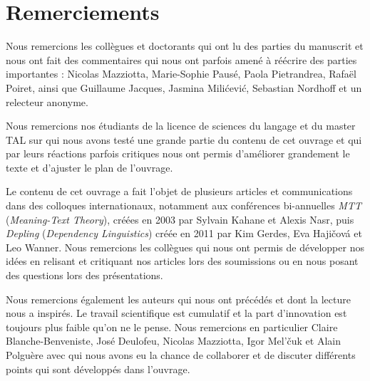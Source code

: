 \section{Remerciements}\label{sec:0.0.13}

Nous remercions les collègues et doctorants qui ont lu des parties du manuscrit et nous ont fait des commentaires qui nous ont parfois amené à réécrire des parties importantes : Nicolas Mazziotta, Marie-Sophie Pausé, Paola Pietrandrea, Rafaël Poiret, ainsi que Guillaume Jacques, Jasmina Milićević, Sebastian Nordhoff et un relecteur anonyme.

Nous remercions nos étudiants de la licence de sciences du langage et du master TAL sur qui nous avons testé une grande partie du contenu de cet ouvrage et qui par leurs réactions parfois critiques nous ont permis d’améliorer grandement le texte et d’ajuster le plan de l’ouvrage.

\begin{sloppypar}
Le contenu de cet ouvrage a fait l’objet de plusieurs articles et communications dans des colloques internationaux, notamment aux conférences bi-annuelles \textit{MTT} (\textit{Meaning-Text Theory}), créées en 2003 par Sylvain Kahane et Alexis Nasr, puis \textit{Depling} (\textit{Dependency Linguistics}) créée en 2011 par Kim Gerdes, Eva Hajičová et Leo Wanner. Nous remercions les collègues qui nous ont permis de développer nos idées en relisant et critiquant nos articles lors des soumissions ou en nous posant des questions lors des présentations.
\end{sloppypar}

Nous remercions également les auteurs qui nous ont précédés et dont la lecture nous a inspirés. Le travail scientifique est cumulatif et la part d’innovation est toujours plus faible qu’on ne le pense. Nous remercions en particulier Claire Blanche-Benveniste, José Deulofeu, Nicolas Mazziotta, Igor Mel’čuk et Alain Polguère avec qui nous avons eu la chance de collaborer et de discuter différents points qui sont développés dans l’ouvrage.


